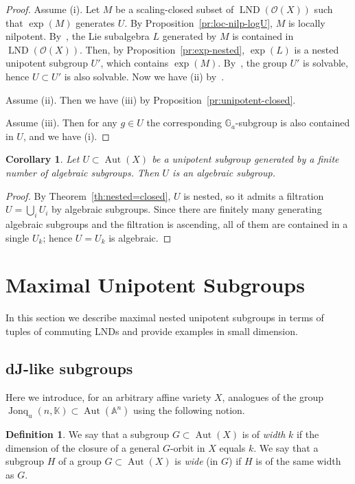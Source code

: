 \documentclass[12pt,a4paper]{amsart}
\theoremstyle{plain}
\newtheorem{corollary}[theorem]{Corollary}
\theoremstyle{definition}
\newtheorem{definition}[theorem]{Definition}
\theoremstyle{remark}
\def\Aut{\operatorname{Aut}}
\def\LND{\operatorname{LND}}
\def\AA{{\mathbb A}}
\def\K{{\mathbb K}}
\def\G{{\mathbb G}}
\def\cO{{\mathcal O}}
\DeclareMathOperator{\Jonq}{Jonq}
\begin{document}
\begin{proof}
   Assume (i).
   Let $M$ be a scaling-closed subset of $\LND(\cO(X))$ such that $\exp(M)$ generates $U$.
   By Proposition~\ref{pr:loc-nilp-logU}, $M$ is locally nilpotent. 
   By~\cite[Corollary 1]{Skutin}, the Lie subalgebra $L$ generated by $M$ is contained in $\LND(\cO(X))$. 
   Then, by Proposition~\ref{pr:exp-nested}, $\exp(L)$ is a nested unipotent subgroup $U'$, which contains $\exp(M)$. 
   By~\cite[Theorem~C]{KZ}, the group $U'$ is solvable, hence $U\subset U'$ is also solvable.
   Now we have (ii) by~\cite[Theorem~B]{KZ}.

   Assume (ii). Then we have (iii) by Proposition~\ref{pr:unipotent-closed}.

   Assume (iii). Then for any $g\in U$ the corresponding $\G_a$-subgroup is also contained in $U$, and we have (i).
\end{proof}

\begin{corollary}\label{cor:unip-alggen}
   Let $U\subset \Aut(X)$ be a unipotent subgroup generated by a finite number of algebraic subgroups. Then $U$ is an algebraic subgroup.
\end{corollary}
\begin{proof}
   By Theorem~\ref{th:nested=closed}, $U$ is nested, so it admits a filtration $U=\bigcup_i U_i$ by algebraic subgroups. Since there are finitely many generating algebraic subgroups and the filtration is ascending, all of them are contained in a single $U_k$; hence $U=U_k$ is algebraic.
\end{proof}




\section{Maximal Unipotent Subgroups}\label{sec:max-unip}
In this section we describe maximal nested unipotent subgroups in terms of tuples of commuting LNDs and provide examples in small dimension.

\subsection{dJ-like subgroups}\label{sec:dJ-like}
Here we introduce, for an arbitrary affine variety $X$, analogues of the group $\Jonq_u(n,\K)\subset\Aut(\AA^n)$ using the following notion. 

\begin{definition}\label{def:width}
   We say that a subgroup $G\subset\Aut(X)$ is of \emph{width} $k$ if the dimension of the closure of a general $G$-orbit in $X$ equals $k$. 
   We say that a subgroup $H$ of a group $G\subset\Aut(X)$ is \emph{wide} (in $G$) if $H$ is of the same width as $G$.
\end{definition}
\end{document}
